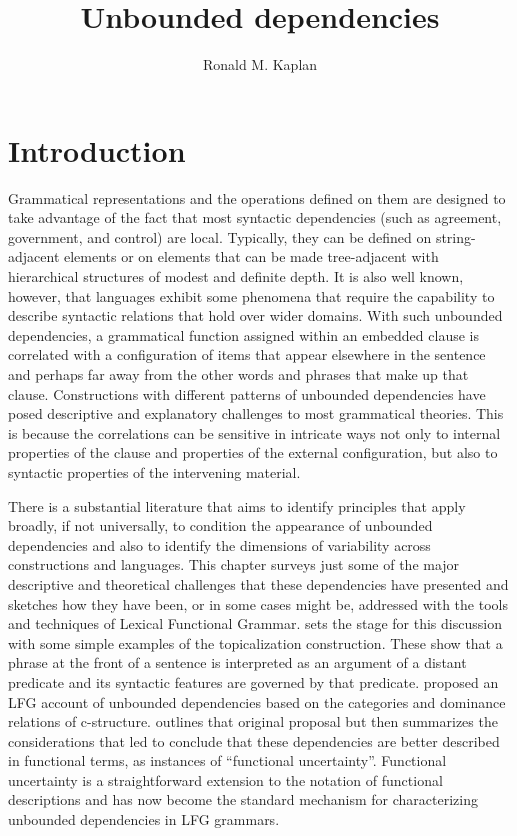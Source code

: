 \documentclass[output=paper,hidelinks]{langscibook}
\title{Unbounded dependencies}
\author{Ronald M. Kaplan\affiliation{Stanford University}}
\begin{document}
\maketitle
\label{chap:LDDs}

\section{Introduction}\label{sec:ldds:intro}

Grammatical representations and the operations defined on them are designed to take advantage of the fact that most syntactic dependencies (such as agreement, government, and control) are local. Typically, they can be defined on string-adjacent elements or on elements that can be made tree-adjacent with hierarchical structures of modest and definite depth. It is also well known, however, that languages exhibit some phenomena that require the capability to describe syntactic relations that hold over wider domains.  With such unbounded dependencies, a grammatical function assigned within an embedded clause is correlated with a configuration of items that appear elsewhere in the sentence and perhaps far away from the other words and phrases that make up that clause.  Constructions with different patterns of unbounded dependencies have posed descriptive and explanatory challenges to most grammatical theories.  This is because the correlations can be sensitive in intricate ways not only to internal properties of the clause and properties of the external configuration, but also to syntactic properties of the intervening material.

There is a substantial literature that aims to identify principles that apply broadly, if not universally, to condition the appearance of unbounded dependencies and also to identify the dimensions of variability across constructions and languages.  This chapter surveys just some of the major descriptive and theoretical challenges that these dependencies have presented and sketches how they have been, or in some cases might be, addressed with the tools and techniques of Lexical Functional Grammar.   sets the stage for this discussion with some simple examples of the topicalization construction.  These show that a phrase at the front of a sentence is interpreted as an argument of a distant predicate and its syntactic features are governed by that predicate.  \citet{kaplanbresnan82} proposed an LFG account of unbounded dependencies based on the categories and dominance relations of c-structure.   outlines that original proposal but then summarizes the considerations that led \citet{kaplzaen89} to conclude that these dependencies are better described in functional terms, as instances of ``functional uncertainty''.  Functional uncertainty is a straightforward extension to the notation of functional descriptions and has now become the standard mechanism for characterizing unbounded dependencies in LFG grammars.
\end{document}
